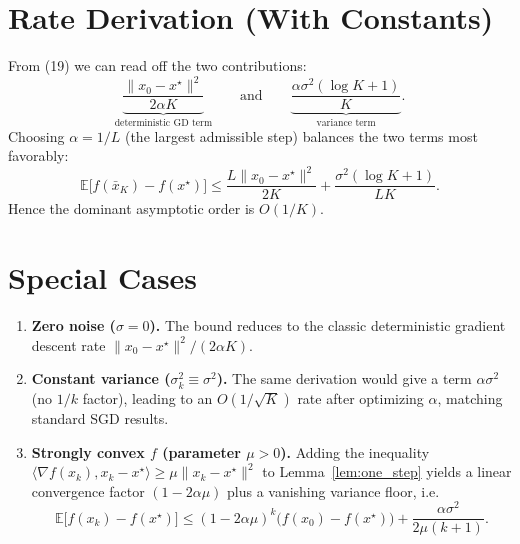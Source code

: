 \documentclass{article}
\begin{document}
\section*{Rate Derivation (With Constants)}
From (19) we can read off the two contributions:
\[
\underbrace{\frac{\|x_{0}-x^{\star}\|^{2}}{2\alpha K}}_{\text{deterministic GD term}}
\qquad\text{and}\qquad
\underbrace{\frac{\alpha\sigma^{2}(\log K+1)}{K}}_{\text{variance term}}.
\]
Choosing $\alpha=1/L$ (the largest admissible step) balances the two terms most favorably:
\[
\mathbb{E}\!\bigl[f(\bar x_{K})-f(x^{\star})\bigr]
\le
\frac{L\|x_{0}-x^{\star}\|^{2}}{2K}
+\frac{\sigma^{2}(\log K+1)}{L K}.
\]
Hence the dominant asymptotic order is $O(1/K)$.

\section*{Special Cases}
\begin{enumerate}[label=\alph*.]
\item \textbf{Zero noise ($\sigma=0$).}  The bound reduces to the classic deterministic gradient descent rate $\|x_{0}-x^{\star}\|^{2}/(2\alpha K)$.
\item \textbf{Constant variance ($\sigma_{k}^{2}\equiv\sigma^{2}$).}  The same derivation would give a term $\alpha\sigma^{2}$ (no $1/k$ factor), leading to an $O(1/\sqrt{K})$ rate after optimizing $\alpha$, matching standard SGD results.
\item \textbf{Strongly convex $f$ (parameter $\mu>0$).}  Adding the inequality 
$\langle\nabla f(x_{k}),x_{k}-x^{\star}\rangle\ge \mu\|x_{k}-x^{\star}\|^{2}$
to Lemma~\ref{lem:one_step} yields a linear convergence factor $(1-2\alpha\mu)$ plus a vanishing variance floor, i.e.
\[
\mathbb{E}\!\bigl[f(x_{k})-f(x^{\star})\bigr]
\le
(1-2\alpha\mu)^{k}\bigl(f(x_{0})-f(x^{\star})\bigr)
+\frac{\alpha\sigma^{2}}{2\mu(k+1)}.
\]
\end{enumerate}
\end{document}
